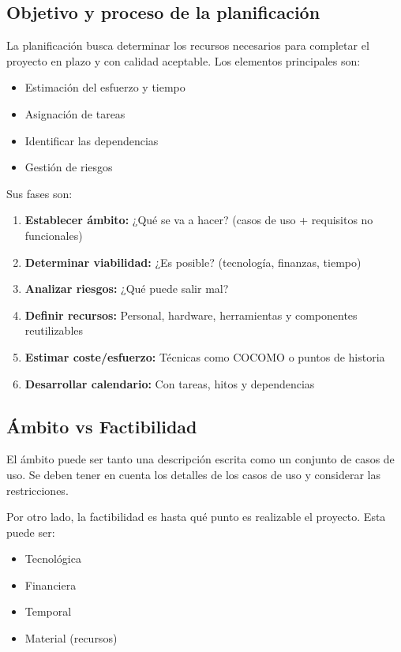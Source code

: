 \subsection{Objetivo y proceso de la planificación}\label{subsec:objetivo-y-proceso-de-la-planificacion}

La planificación busca determinar los recursos necesarios para completar el proyecto en plazo y con calidad aceptable.
Los elementos principales son:

\begin{itemize}
    \item Estimación del esfuerzo y tiempo
    \item Asignación de tareas
    \item Identificar las dependencias
    \item Gestión de riesgos
\end{itemize}

Sus fases son:

\begin{enumerate}
    \item \textbf{Establecer ámbito:} ¿Qué se va a hacer?
    (casos de uso + requisitos no funcionales)
    \item \textbf{Determinar viabilidad:} ¿Es posible?
    (tecnología, finanzas, tiempo)
    \item \textbf{Analizar riesgos:} ¿Qué puede salir mal?
    \item \textbf{Definir recursos:} Personal, hardware, herramientas y componentes reutilizables
    \item \textbf{Estimar coste/esfuerzo:} Técnicas como COCOMO o puntos de historia
    \item \textbf{Desarrollar calendario:} Con tareas, hitos y dependencias
\end{enumerate}

\subsection{Ámbito vs Factibilidad}\label{subsec:ambito-vs-factibilidad}

El ámbito puede ser tanto una descripción escrita como un conjunto de casos de uso.
Se deben tener en cuenta los detalles de los casos de uso y considerar las restricciones.

Por otro lado, la factibilidad es hasta qué punto es realizable el proyecto.
Esta puede ser:

\begin{itemize}
    \item Tecnológica
    \item Financiera
    \item Temporal
    \item Material (recursos)
\end{itemize}

